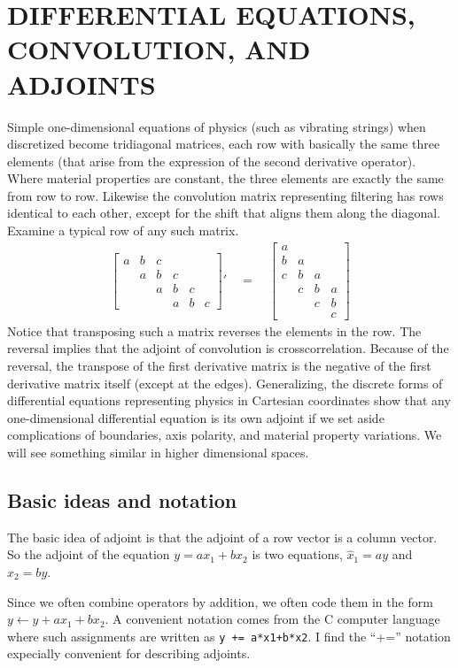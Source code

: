 \section{DIFFERENTIAL EQUATIONS, CONVOLUTION, AND ADJOINTS}
\par
Simple one-dimensional equations of physics (such as vibrating strings)
when discretized become tridiagonal matrices,
each row with basically the same three elements
(that arise from the expression of the second derivative operator).
Where material properties are constant,
the three elements are exactly the same from row to row.
Likewise the convolution matrix representing filtering
has rows identical to each other,
except for the shift that aligns them along the diagonal.
Examine a typical row of any such matrix.
\begin{eqnarray}
	\left[
	\begin{array}{cccccc}
		a& b& c&  &  &    \\
		 & a& b& c&  &    \\
		 &  & a& b& c&    \\
		 &  &  & a& b&c 
	\end{array}
	\right]'
	\quad = \quad
	\left[
	\begin{array}{cccc}
		 a&  &  &    \\
		 b& a&  &    \\
		 c& b& a&    \\
		  & c& b&a   \\
		  &  & c&b   \\
		  &  &  &c   
	\end{array}
	\right]
\end{eqnarray}
Notice that transposing such a matrix reverses the elements in the row.
The reversal implies that the adjoint of convolution is crosscorrelation.
Because of the reversal,
the transpose of the first derivative matrix
is the negative of the first derivative matrix itself
(except at the edges).
Generalizing, the discrete forms of differential equations
representing physics in Cartesian coordinates
show that any one-dimensional differential equation is its own adjoint
if we set aside complications of boundaries,
axis polarity, and material property variations.
We will see something similar in higher dimensional spaces.



\subsection{Basic ideas and notation}
The basic idea of adjoint
is that the adjoint of a row vector
is a column vector.
So the adjoint of the equation
$y=ax_1+bx_2$
is two equations,
$\hat x_1 = ay$ and
$\hat x_2 = by$.
\par
Since we often combine operators by addition,
we often code them in the form
$y\leftarrow y+ax_1+bx_2$.
A convenient notation comes from the C computer language
where such assignments are written as
{\tt y += a*x1+b*x2}.
I find the ``+='' notation expecially 
convenient for describing adjoints.


